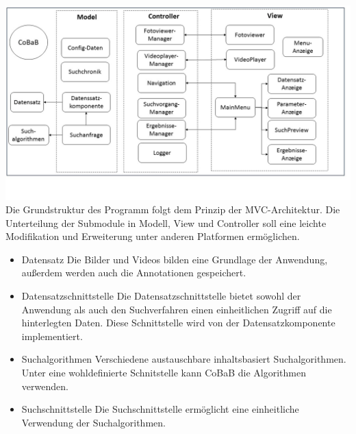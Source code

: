 \includegraphics[width=1\linewidth]{img/SystemModell}
Die Grundstruktur des Programm folgt dem Prinzip der MVC-Architektur. Die Unterteilung der Submodule in Modell, View und Controller soll eine leichte Modifikation und Erweiterung unter anderen Platformen ermöglichen.

\begin{itemize}
\item Datensatz\newline
Die Bilder und Videos bilden eine Grundlage der Anwendung, außerdem werden auch die Annotationen gespeichert.
\item Datensatzschnittstelle\newline
Die Datensatzschnittstelle bietet sowohl der Anwendung als auch den Suchverfahren einen einheitlichen Zugriff auf die hinterlegten Daten. Diese Schnittstelle wird von der Datensatzkomponente implementiert.
\item Suchalgorithmen\newline
Verschiedene austauschbare inhaltsbasiert Suchalgorithmen. Unter eine wohldefinierte Schnitstelle kann CoBaB die Algorithmen verwenden.
\item Suchschnittstelle\newline
Die Suchschnittstelle ermöglicht eine einheitliche Verwendung der Suchalgorithmen.
\end{itemize}

